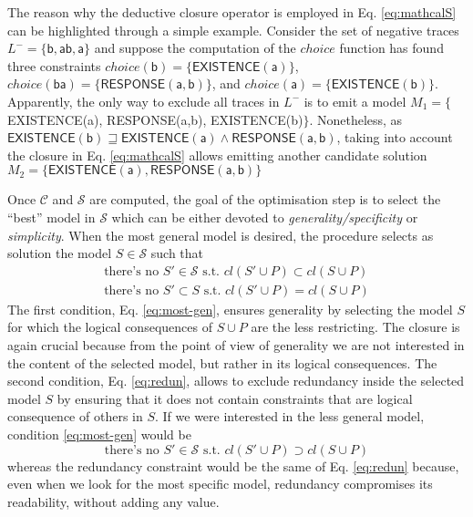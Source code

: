 The reason why the deductive closure operator is employed in Eq. \ref{eq:mathcalS} can be highlighted through a simple example. Consider the set of negative traces $L^-=\{\mathsf{b, ab, a}\}$ and suppose the computation of the ${choice}$ function has found three constraints $choice(\mathsf{b})=\{\mathsf{EXISTENCE(a)}\}$, $choice(\mathsf{ba})=\{\mathsf{RESPONSE(a,b)}\}$, and $choice(\mathsf{a})=\{\mathsf{EXISTENCE(b)}\}$. Apparently, the only way to exclude all traces in $L^-$ is to emit a model $M_1=\{$\textsf{EXISTENCE(a), RESPONSE(a,b), EXISTENCE(b)}$\}$. Nonetheless, as 
$\mathsf{EXISTENCE(b)} \sqsupseteq \mathsf{EXISTENCE(a)} \land  \mathsf{RESPONSE(a,b)}$, 
taking into account the closure in Eq. \ref{eq:mathcalS} allows emitting another candidate solution $M_2=\{\mathsf{EXISTENCE(a), RESPONSE(a,b)}\}$

Once $\mathcal{C}$ and $\mathcal{S}$ are computed, the goal of the optimisation step is to select the ``best'' model in $\mathcal{S}$ which can be either devoted to \emph{generality/specificity} or \emph{simplicity}.
When the most general model is desired, the procedure selects as solution the model $S\in \mathcal{S}$ such that 
\begin{subequations}
  \begin{align}
    \text{there's no $S'\in\mathcal{S}$ s.t. } cl(S'\cup P)\subset cl(S\cup P) \label{eq:most-gen}\\
    \text{there's no $S'\subset S$ s.t. } cl(S'\cup P)=cl(S\cup P)\label{eq:redun}
  \end{align}
\end{subequations}
%
The first condition, Eq. \eqref{eq:most-gen}, ensures generality by selecting the model $S$ for which the logical consequences of $S\cup P$ are the less restricting. The closure is again crucial because from the point of view of generality we are not interested in the content of the selected model, but rather in its logical consequences.
%
The second condition, Eq. \eqref{eq:redun}, allows to exclude redundancy inside the selected model $S$ by ensuring that it does not contain constraints that are logical consequence of others in $S$.
%
If we were interested in the less general model, condition \eqref{eq:most-gen} would be 
\begin{equation}\label{eq:most-spe}
\text{there's no $S'\in\mathcal{S}$ s.t. } cl(S'\cup P)\supset cl(S\cup P)
\end{equation}
whereas the redundancy constraint would be the same of Eq. \eqref{eq:redun} because, even when we look for the most specific model, redundancy compromises its readability, without adding any value.

